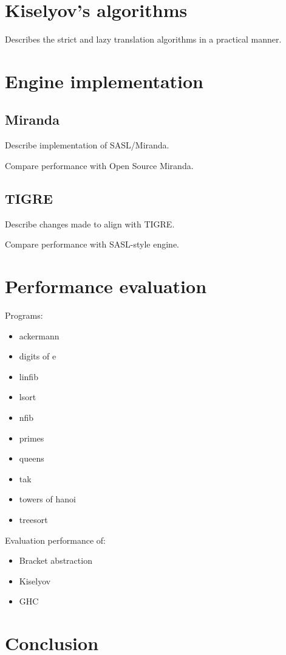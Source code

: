 \documentclass[conference]{IEEEtran}
\begin{document}
\section*{Kiselyov's algorithms}
Describes the strict and lazy translation algorithms in a practical manner.

\section*{Engine implementation}
\subsection*{Miranda}
Describe implementation of SASL/Miranda.

Compare performance with Open Source Miranda.

\subsection*{TIGRE}
Describe changes made to align with TIGRE.

Compare performance with SASL-style engine.

\section*{Performance evaluation}
Programs:
\begin{itemize}
    \item ackermann
    \item digits of e
    \item linfib
    \item lsort
    \item nfib
    \item primes
    \item queens
    \item tak
    \item towers of hanoi
    \item treesort
\end{itemize}

Evaluation performance of:

\begin{itemize}
    \item Bracket abstraction
    \item Kiselyov
    \item GHC
\end{itemize}

\section*{Conclusion}








\end{document}

